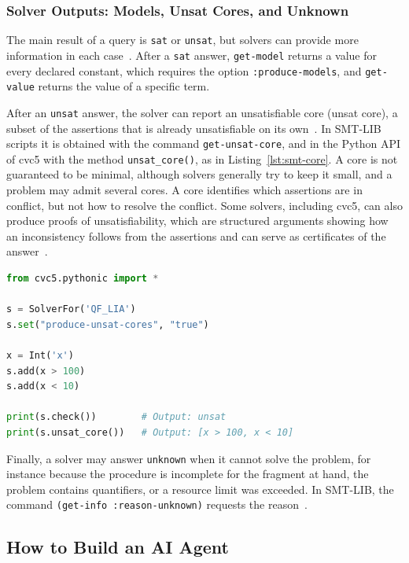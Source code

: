 \subsubsection{Solver Outputs: Models, Unsat Cores, and Unknown}
The main result of a query is \texttt{sat} or \texttt{unsat}, but solvers can provide more information in each case~\cite{barrett2024tutorial}. After a \texttt{sat} answer, \texttt{get-model} returns a value for every declared constant, which requires the option \texttt{:produce-models}, and \texttt{get-value} returns the value of a specific term.

After an \texttt{unsat} answer, the solver can report an unsatisfiable core (unsat core), a subset of the assertions that is already unsatisfiable on its own~\cite{barrett2018smt,barrett2024tutorial}. In SMT-LIB scripts it is obtained with the command \texttt{get-unsat-core}, and in the Python API of cvc5 with the method \texttt{unsat\_core()}, as in Listing~\ref{lst:smt-core}. A core is not guaranteed to be minimal, although solvers generally try to keep it small, and a problem may admit several cores. A core identifies which assertions are in conflict, but not how to resolve the conflict. Some solvers, including cvc5, can also produce proofs of unsatisfiability, which are structured arguments showing how an inconsistency follows from the assertions and can serve as certificates of the answer~\cite{barrett2024tutorial}.

\begin{lstlisting}[language=Python, caption={Retrieving an unsat core with the cvc5 Python API.}, label={lst:smt-core}]
from cvc5.pythonic import *

s = SolverFor('QF_LIA')
s.set("produce-unsat-cores", "true")

x = Int('x')
s.add(x > 100)
s.add(x < 10)

print(s.check())        # Output: unsat
print(s.unsat_core())   # Output: [x > 100, x < 10]
\end{lstlisting}

Finally, a solver may answer \texttt{unknown} when it cannot solve the problem, for instance because the procedure is incomplete for the fragment at hand, the problem contains quantifiers, or a resource limit was exceeded. In SMT-LIB, the command \texttt{(get-info :reason-unknown)} requests the reason~\cite{barrett2024tutorial}.


\subsection{How to Build an AI Agent}
\label{subsec:build-agent}
 
